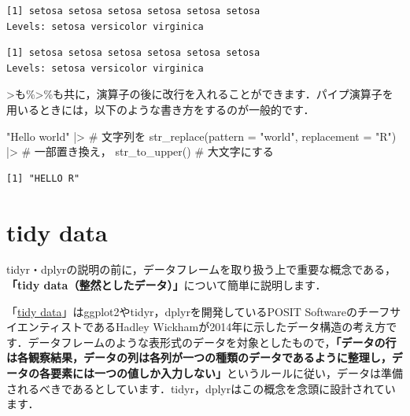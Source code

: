 \documentclass[
  letterpaper,
  DIV=11,
  numbers=noendperiod]{scrreprt}
\newenvironment{Shaded}{\begin{snugshade}}{\end{snugshade}}
\newcommand{\AttributeTok}[1]{\textcolor[rgb]{0.40,0.45,0.13}{#1}}
\newcommand{\CommentTok}[1]{\textcolor[rgb]{0.37,0.37,0.37}{#1}}
\newcommand{\FunctionTok}[1]{\textcolor[rgb]{0.28,0.35,0.67}{#1}}
\newcommand{\NormalTok}[1]{\textcolor[rgb]{0.00,0.23,0.31}{#1}}
\newcommand{\SpecialCharTok}[1]{\textcolor[rgb]{0.37,0.37,0.37}{#1}}
\newcommand{\StringTok}[1]{\textcolor[rgb]{0.13,0.47,0.30}{#1}}
\begin{document}
\begin{verbatim}
[1] setosa setosa setosa setosa setosa setosa
Levels: setosa versicolor virginica
\end{verbatim}

\begin{Shaded}
\end{Shaded}

\begin{verbatim}
[1] setosa setosa setosa setosa setosa setosa
Levels: setosa versicolor virginica
\end{verbatim}

\textbar\textgreater も\%\textgreater\%も共に，演算子の後に改行を入れることができます．パイプ演算子を用いるときには，以下のような書き方をするのが一般的です．

\begin{Shaded}
\begin{Highlighting}[]
\StringTok{"Hello world"} \SpecialCharTok{|\textgreater{}} \CommentTok{\# 文字列を}
  \FunctionTok{str\_replace}\NormalTok{(}\AttributeTok{pattern =} \StringTok{"world"}\NormalTok{, }\AttributeTok{replacement =} \StringTok{"R"}\NormalTok{) }\SpecialCharTok{|\textgreater{}} \CommentTok{\# 一部置き換え，}
  \FunctionTok{str\_to\_upper}\NormalTok{() }\CommentTok{\# 大文字にする}
\end{Highlighting}
\end{Shaded}

\begin{verbatim}
[1] "HELLO R"
\end{verbatim}

\hypertarget{tidy-data}{%
\section{tidy data}\label{tidy-data}}

tidyr・dplyrの説明の前に，データフレームを取り扱う上で重要な概念である，\textbf{「tidy
data（整然としたデータ）」}について簡単に説明します．

「\href{https://r4ds.hadley.nz/data-tidy.html}{tidy
data}」はggplot2やtidyr，dplyrを開発しているPOSIT
SoftwareのチーフサイエンティストであるHadley
Wickhamが2014年に示したデータ構造の考え方です．データフレームのような表形式のデータを対象としたもので，\textbf{「データの行は各観察結果，データの列は各列が一つの種類のデータであるように整理し，データの各要素には一つの値しか入力しない」}というルールに従い，データは準備されるべきであるとしています．tidyr，dplyrはこの概念を念頭に設計されています．
\end{document}
